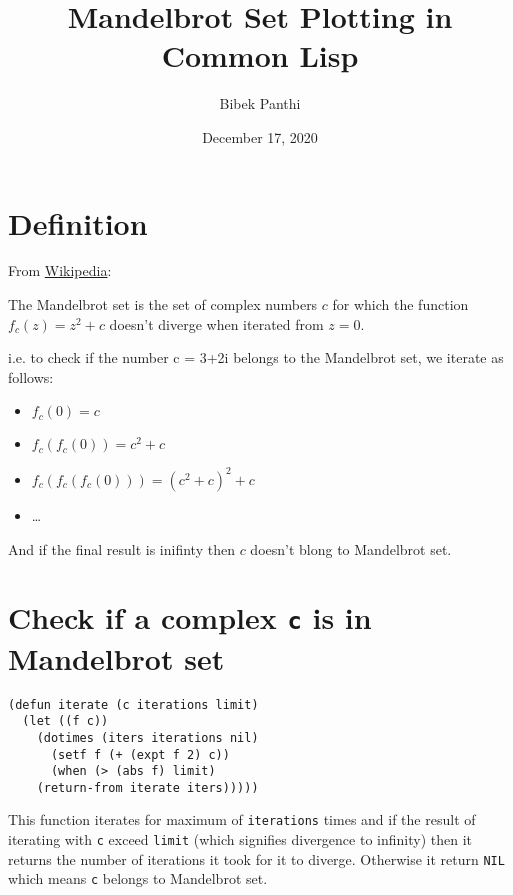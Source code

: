 \documentclass[11pt,a4paper]{article}
\author{Bibek Panthi}
\date{December 17, 2020}
\title{Mandelbrot Set Plotting in Common Lisp}
\begin{document}
\maketitle
\tableofcontents

\newpage

\section{Definition}
\label{sec:orgcaba351}
From \href{https://en.wikipedia.org/wiki/Mandelbrot\_set}{Wikipedia}:

The Mandelbrot set is the set of complex numbers \(c\) for which the function \(f_c(z)= z^2+c\) doesn't diverge when iterated from \(z=0\). 

i.e. to check if the number c = 3+2i belongs to the Mandelbrot set, we iterate as follows:
\begin{itemize}
\item \(f_c(0) = c\)
\item \(f_c(f_c(0)) = c^2+c\)
\item \(f_c(f_c(f_c(0))) = (c^2+c)^{2} + c\)
\item \ldots{}
\end{itemize}

And if the final result is inifinty then \(c\) doesn't blong to Mandelbrot set. 

\section{Check if a complex \texttt{c} is in Mandelbrot set}
\label{sec:orgd00c530}
\begin{lstlisting}
(defun iterate (c iterations limit)
  (let ((f c))
    (dotimes (iters iterations nil)
      (setf f (+ (expt f 2) c))
      (when (> (abs f) limit)
	(return-from iterate iters)))))
\end{lstlisting}

This function iterates for maximum of \texttt{iterations} times and if the result of iterating with \texttt{c} exceed \texttt{limit} (which signifies divergence to infinity) then it returns the number of iterations it took for it to diverge. Otherwise it return \texttt{NIL} which means \texttt{c} belongs to Mandelbrot set. 
\end{document}

